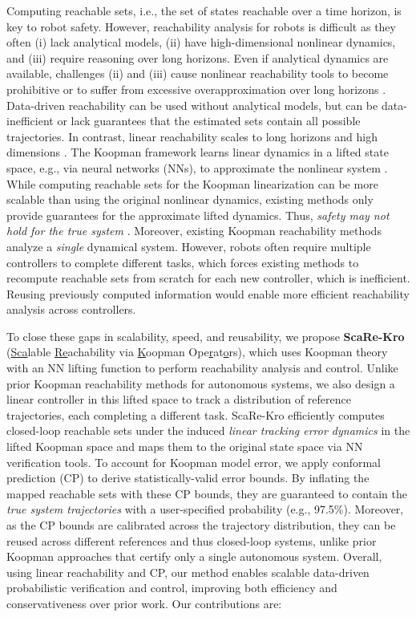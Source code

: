 \documentclass{l4dc2026}
\begin{document}
Computing reachable sets, i.e., the set of states reachable over a time horizon, is key to robot safety. However, reachability analysis for robots is difficult as they often (i) lack analytical models, (ii) have high-dimensional nonlinear dynamics, and (iii) require reasoning over long horizons. Even if analytical dynamics are available, challenges (ii) and (iii) cause nonlinear reachability tools \citep{bansal2017HJReach, DBLP:conf/cpsweek/Althoff15} to become prohibitive or to suffer from excessive overapproximation over long horizons \citep{Rober2024CARV}. Data-driven reachability \citep{10772635datadrivenreach, DBLP:journals/fmsd/BakBHKLP25} can be used without analytical models, but can be data-inefficient or lack guarantees that the estimated sets contain all possible trajectories. 
In contrast, linear reachability scales to long horizons and high dimensions \citep{10.1145/3302504.3311792}. The Koopman framework learns linear dynamics in a lifted state space, e.g., via neural networks (NNs), to approximate the nonlinear system \citep{koop_survey}. While computing reachable sets for the Koopman linearization can be more scalable than using the original nonlinear dynamics, existing methods only provide guarantees for the approximate lifted dynamics. Thus, \textit{safety may not hold for the true system} \citep{DBLP:conf/adhs/BakBDGP21, DBLP:journals/fmsd/BakBHKLP25}. Moreover, existing Koopman reachability methods analyze a \textit{single} dynamical system. However, robots often require multiple controllers to complete different tasks, which forces existing methods to recompute reachable sets from scratch for each new controller, which is inefficient. Reusing previously computed information would enable more efficient reachability analysis across controllers.

To close these gaps in scalability, speed, and reusability, we propose \textbf{ScaRe-Kro} (\underline{Sca}lable \underline{Re}achability via \underline{K}oopman Ope\underline{r}at\underline{o}rs), which uses Koopman theory with an NN lifting function to perform reachability analysis and control. Unlike prior Koopman reachability methods for autonomous systems, we also design a linear controller in this lifted space to track a distribution of reference trajectories, each completing a different task. ScaRe-Kro efficiently computes closed-loop reachable sets under the induced \textit{linear tracking error dynamics} in the lifted Koopman space and maps them to the original state space via NN verification tools. To account for Koopman model error, we apply conformal prediction (CP) to derive statistically-valid error bounds. By inflating the mapped reachable sets with these CP bounds, they are guaranteed to contain the \textit{true system trajectories} with a user-specified probability (e.g., 97.5\%). Moreover, as the CP bounds are calibrated across the trajectory distribution, they can be reused across different references and thus closed-loop systems, unlike prior Koopman approaches that certify only a single autonomous system. Overall, using linear reachability and CP, our method enables scalable data-driven probabilistic verification and control, improving both efficiency and conservativeness over prior work. Our contributions are:
\end{document}
